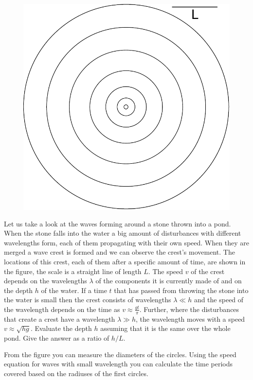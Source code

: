 {\ifEngStatement
\begin{figure}%
\includegraphics[width=\linewidth]{2013-v3g-06-lained}%
\end{figure}
Let us take a look at the waves forming around a stone thrown into a pond. When the stone falls into the water a big amount of disturbances with different wavelengths form, each of them propagating with their own speed. When they are merged a wave crest is formed and we can observe the crest’s movement. The locations of this crest, each of them after a specific amount of time, are shown in the figure, the scale is a straight line of length $L$. The speed $v$ of the crest depends on the wavelengths $\lambda$ of the components it is currently made of and on the depth $h$ of the water. If a time $t$ that has passed from throwing the stone into the water is small then the crest consists of wavelengths $\lambda \ll h$ and the speed of the wavelength depends on the time as $v \approx \frac{gt}{\pi}$. Further, where the disturbances that create a crest have a wavelength $\lambda \gg h$, the wavelength moves with a speed $v
\approx \sqrt{hg}$. Evaluate the depth $h$ assuming that it is the same over the whole pond. Give the answer as a ratio of $h/L$.
\fi


\ifEngHint
From the figure you can measure the diameters of the circles. Using the speed equation for waves with small wavelength you can calculate the time periods covered based on the radiuses of the first circles.
\fi


}
